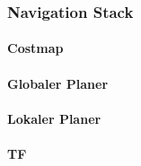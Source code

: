 \subsubsection{Navigation Stack}
\label{subsec:02navigatinStack}

\paragraph{Costmap}
\paragraph{Globaler Planer}
\paragraph{Lokaler Planer}
\paragraph{TF}